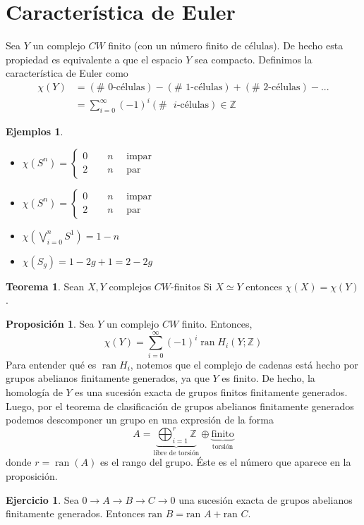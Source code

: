 \documentclass[spanish]{book}
\theoremstyle{definition}
\newtheorem*{teo}{Teorema}
\newtheorem*{prop}{Proposición}
\newtheorem*{ejer}{Ejercicio}
\newtheorem*{ejems}{Ejemplos}
\newcommand{\Z}{\mathbb{Z}}
\DeclareMathOperator{\ran}{ran}
\begin{document}
\section{Característica de Euler}
	Sea $Y$ un complejo $CW$ finito (con un número finito de células). De hecho esta propiedad es equivalente a que el espacio $Y$ sea compacto. Definimos la característica de Euler como
	\begin{align*}
		\chi(Y)&=(\#\text{ 0-células})-(\#\text{ 1-células})+(\#\text{ 2-células})-...\\
		&=\sum_{i=0}^\infty(-1)^i(\#\text{ }i\text{-células})\in\Z
	\end{align*}
	\begin{ejems}\leavevmode
		
		\begin{itemize}
			\item $\chi(S^n)=\begin{cases}0\qquad n\quad\text{ impar}\\2\qquad n\quad\text{ par}\end{cases}$
			\item $\chi(S^n)=\begin{cases}0\qquad n\quad\text{ impar}\\2\qquad n\quad\text{ par}\end{cases}$
			\item $\chi(\bigvee_{i=0}^nS^1)=1-n$
			\item $\chi(S_g)=1-2g+1=2-2g$
		\end{itemize}
	\end{ejems}
	\begin{teo}
		Sean $X,Y$ complejos $CW$-finitos Si $X\simeq Y$ entonces $\chi(X)=\chi(Y)$.
	\end{teo}
	\begin{prop}
		 Sea $Y$ un complejo $CW$ finito. Entonces,
		 \[\chi(Y)=\sum_{i=0}^\infty(-1)^i\ran H_i(Y;\Z)\]
		 Para entender qué es $\ran H_i$, notemos que el complejo de cadenas está hecho por grupos abelianos finitamente generados, ya que $Y$ es finito. De hecho, la homología de $Y$ es una sucesión exacta de grupos finitos finitamente generados. Luego, por el teorema de clasificación de grupos abelianos finitamente generados podemos descomponer un grupo en una expresión de la forma
		 \[A=\underbrace{\bigoplus_{i=1}^r\Z}_\text{libre de torsión}\oplus\underbrace{\text{finito}}_{\text{torsión}}\]
		 donde $r=\ran(A)$ es el rango del grupo. Éste es el número que aparece en la proposición.
	\end{prop}
	\begin{ejer}
		Sea $0\to A\to B\to C\to 0$ una sucesión exacta de grupos abelianos finitamente generados. Entonces $\text{ran }B=\text{ran }A+\text{ran }C$.
	\end{ejer}
\end{document}
